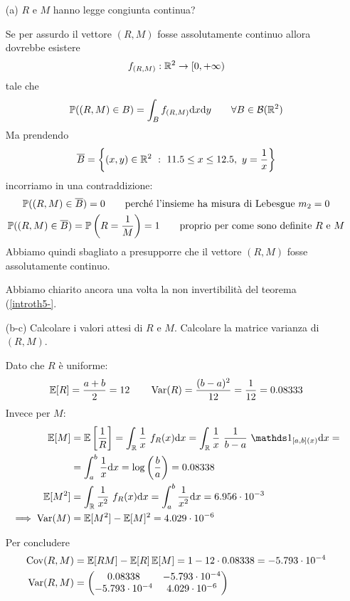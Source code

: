 \begin{enumerate}
\item [(a)] $R$ e $M$ hanno legge congiunta continua?

Se per assurdo il vettore $(R,M)$ fosse assolutamente continuo allora dovrebbe esistere
\[
f_{(R,M)}:\mathbb{R}^2\to[0,+\infty)
\]
tale che
\[
\mathbb{P}((R,M)\in B)=\int_B f_{(R,M)}\mathrm{d} x \mathrm{d} y\qquad\forall B\in\mathcal{B}(\mathbb{R}^2)
\]
Ma prendendo
\[
\overline{B}=\left\{(x,y)\in\mathbb{R}^2\ :\ 11.5\leq x\leq 12.5,\ y=\frac{1}{x}  \right\}
\]
incorriamo in una contraddizione:
\begin{gather*} 
\mathbb{P}((R,M)\in \overline{B})=0\qquad\text{perché l'insieme ha misura di Lebesgue }m_2=0 \\
\mathbb{P}((R,M)\in \overline{B})=\mathbb{P}\left(R=\frac{1}{M}\right)=1\qquad\text{proprio per come sono definite }R\text{ e }M
\end{gather*}
Abbiamo quindi sbagliato a presupporre che il vettore $(R,M)$ fosse assolutamente continuo.

\begin{oss} Abbiamo chiarito ancora una volta la non invertibilità del teorema (\ref{introth5-}. \end{oss}

\item [(b-c)] Calcolare i valori attesi di $R$ e $M$. Calcolare la matrice varianza di $(R,M)$.

Dato che $R$ è uniforme:
\[
\mathbb{E}[R]=\frac{a+b}{2}=12 \qquad \operatorname{Var}(R)=\frac{(b-a)^2}{12}=\frac{1}{12}=0.08333
\]
Invece per $M$:
\begin{gather*}
\begin{aligned}
\EE[M]&=\EE\left[ \frac{1}{R} \right]=\int_\RR \frac{1}{x}\ f_R(x)\dx=\int_\RR \frac{1}{x}\ \frac{1}{b-a}\ \Ind_{[a,b](x)}\dx=\\
&=\int_{a}^{b} \frac{1}{x}\dx=\log\left(\frac{b}{a} \right)=0.08338\\
\EE[M^2]&=\int_\RR \frac{1}{x^2}\ f_R(x)\dx=\int_{a}^{b} \frac{1}{x^2}\dx=6.956\cdot 10^{-3}\\
\implies \Var(M)&=\EE[M^2]-\EE[M]^2=4.029\cdot 10^{-6}
\end{aligned}
\end{gather*}

Per concludere
\begin{gather*}
\begin{aligned}
\operatorname{Cov}(R,M)&=\mathbb{E}[RM]-\mathbb{E}[R]\,\mathbb{E}[M]=1-12\cdot 0.08338 = -5.793\cdot 10^{-4}\\
\operatorname{Var}(R,M)&=
\begin{pmatrix}
0.08338 & -5.793\cdot 10^{-4} \\
-5.793\cdot 10^{-4} & 4.029\cdot 10^{-6} \\
\end{pmatrix}
\end{aligned}
\end{gather*}


\end{enumerate}
